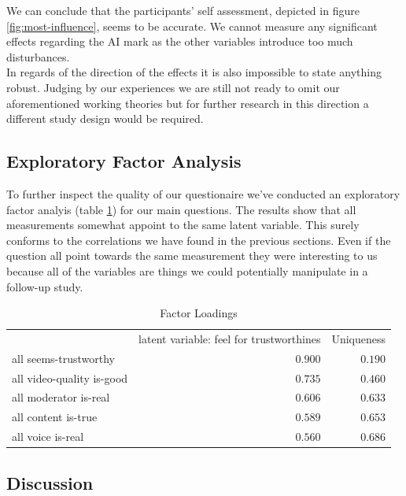 \documentclass[
  a4paper,  %
  twoside,  %
  bibliography=totoc,
  headsepline,
  cleardoublepage=empty,
  parskip=half,
  draft=false
]{scrbook}
\begin{document}
 We can conclude that the participants' self assessment, depicted in figure \ref{fig:most-influence}, seems to be accurate. We cannot measure any significant effects regarding the AI mark as the other variables introduce too much disturbances. \\
 In regards of the direction of the effects it is also impossible to state anything robust. Judging by our experiences we are still not ready to omit our aforementioned working theories but for further research in this direction a different study design would be required.

 \subsection{Exploratory Factor Analysis}
\label{subsec:factor-analysis}
 To further inspect the quality of our questionaire we've conducted an exploratory factor analyis (table \ref{tab:factorLoadings}) for our main questions. The results show that all measurements somewhat appoint to the same latent variable. This surely conforms to the correlations we have found in the previous sections. Even if the question all point towards the same measurement they were interesting to us because all of the variables are things we could potentially manipulate in a follow-up study. 

\begin{table}[h]
	\centering
	\caption{Factor Loadings}
	\label{tab:factorLoadings}
	{
		\begin{tabular}{lrr}
			\toprule
			 & latent variable: feel for trustworthines & Uniqueness  \\
			\cmidrule[0.4pt]{1-3}
			all seems-trustworthy & $0.900$ & $0.190$  \\
			all video-quality is-good & $0.735$ & $0.460$  \\
			all moderator is-real & $0.606$ & $0.633$  \\
			all content is-true & $0.589$ & $0.653$  \\
			all voice is-real & $0.560$ & $0.686$  \\
			\bottomrule
		\end{tabular}
	}
\end{table}

\subsection{Discussion}
\end{document}
